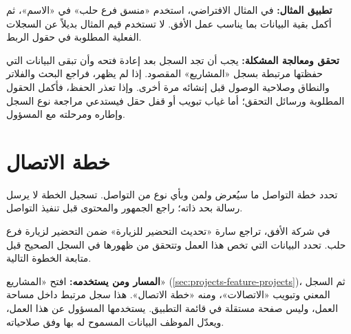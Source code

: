 \textbf{تطبيق المثال:} في المثال الافتراضي، استخدم «منسق فرع حلب» في «الاسم»، ثم أكمل بقية البيانات بما يناسب عمل الأفق. لا تستخدم قيم المثال بديلاً عن السجلات الفعلية المطلوبة في حقول الربط.

\textbf{تحقق ومعالجة المشكلة:} يجب أن تجد السجل بعد إعادة فتحه وأن تبقى البيانات التي حفظتها مرتبطة بسجل «المشاريع» المقصود. إذا لم يظهر، فراجع البحث والفلاتر والنطاق وصلاحية الوصول قبل إنشائه مرة أخرى. وإذا تعذر الحفظ، فأكمل الحقول المطلوبة ورسائل التحقق؛ أما غياب تبويب أو قفل حقل فيستدعي مراجعة نوع السجل وإطاره ومرحلته مع المسؤول.

\clearpage
\section{خطة الاتصال}
\label{sec:projects-feature-communication-plan}

تحدد خطة التواصل ما سيُعرض ولمن وبأي نوع من التواصل. تسجيل الخطة لا يرسل رسالة بحد ذاته؛ راجع الجمهور والمحتوى قبل تنفيذ التواصل.

\begin{rcnote}
في شركة الأفق، تراجع سارة «تحديث التحضير للزيارة» ضمن التحضير لزيارة فرع حلب. تحدد البيانات التي تخص هذا العمل وتتحقق من ظهورها في السجل الصحيح قبل متابعة الخطوة التالية.
\end{rcnote}

\textbf{المسار ومن يستخدمه:} افتح «المشاريع» (\ref{sec:projects-feature-projects})، ثم السجل المعني وتبويب «الاتصالات»، ومنه «خطة الاتصال». هذا سجل مرتبط داخل مساحة العمل، وليس صفحة مستقلة في قائمة التطبيق. يستخدمها المسؤول عن هذا العمل، ويعدّل الموظف البيانات المسموح له بها وفق صلاحياته.

